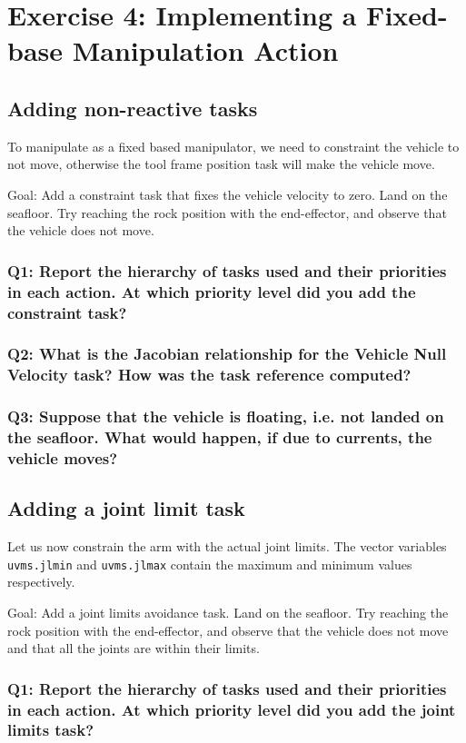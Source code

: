 \documentclass{article}
\begin{document}
\clearpage
\section{Exercise 4: Implementing a Fixed-base Manipulation Action}
\subsection{Adding non-reactive tasks}
To manipulate as a fixed based manipulator, we need to constraint the vehicle to not move, otherwise the tool frame position task will make the vehicle move.

Goal: Add a constraint task that fixes the vehicle velocity to zero. Land on the seafloor. Try reaching the rock position with the end-effector, and observe that the vehicle does not move.

\subsubsection{Q1: Report the hierarchy of tasks used and their priorities in each action. At which priority level did you add the constraint task?}

\subsubsection{Q2: What is the Jacobian relationship for the Vehicle Null Velocity task? How was the task reference computed?}

\subsubsection{Q3: Suppose that the vehicle is floating, i.e. not landed on the seafloor. What would happen, if due to currents, the vehicle moves?}


\subsection{Adding a joint limit task}
Let us now constrain the arm with the actual joint limits. The vector variables \texttt{uvms.jlmin} and \texttt{uvms.jlmax} contain the maximum and minimum values respectively.

Goal: Add a joint limits avoidance task. Land on the seafloor. Try reaching the rock position with the end-effector, and observe that the vehicle does not move and that all the joints are within their limits.

\subsubsection{Q1: Report the hierarchy of tasks used and their priorities in each action. At which priority level did you add the joint limits task?}
\end{document}
